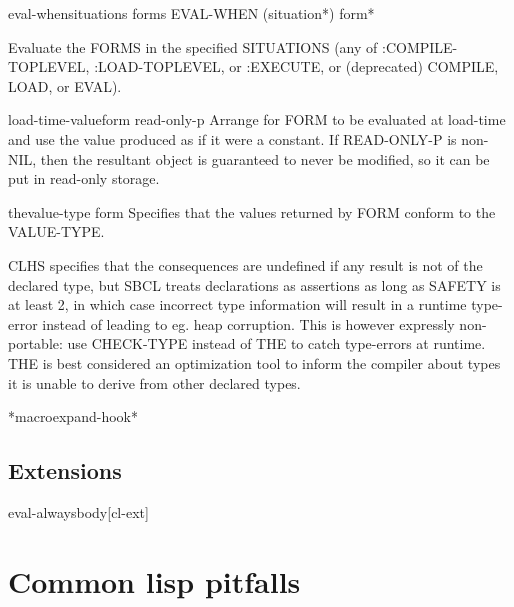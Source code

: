 \documentclass[10pt,english]{book}
\begin{document}
\begin{specialop}{eval-when}{situations \rest forms}
  EVAL-WHEN (situation*) form*

Evaluate the FORMS in the specified SITUATIONS (any of :COMPILE-TOPLEVEL,
:LOAD-TOPLEVEL, or :EXECUTE, or (deprecated) COMPILE, LOAD, or EVAL).
\end{specialop}

\begin{specialop}{load-time-value}{form \op read-only-p}
  Arrange for FORM to be evaluated at load-time and use the value produced
   as if it were a constant. If READ-ONLY-P is non-NIL, then the resultant
   object is guaranteed to never be modified, so it can be put in read-only
   storage.
\end{specialop}

\begin{specialop}{the}{value-type form}
  Specifies that the values returned by FORM conform to the VALUE-TYPE.

CLHS specifies that the consequences are undefined if any result is
not of the declared type, but SBCL treats declarations as assertions
as long as SAFETY is at least 2, in which case incorrect type
information will result in a runtime type-error instead of leading to
eg. heap corruption. This is however expressly non-portable: use
CHECK-TYPE instead of THE to catch type-errors at runtime. THE is best
considered an optimization tool to inform the compiler about types it
is unable to derive from other declared types.
\end{specialop}

\begin{variable}{*macroexpand-hook*}{}
  
\end{variable}

\section{Extensions}
\label{sec:extensions}

\begin{macro}{eval-always}{\body body}[cl-ext]
  
\end{macro}




\chapter{Common lisp pitfalls}
\end{document}
